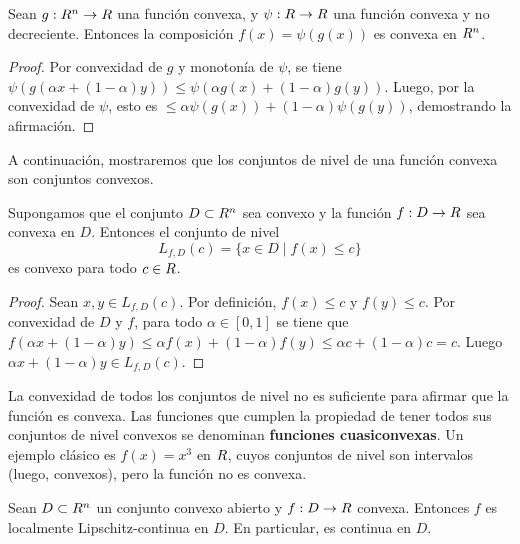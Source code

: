 \begin{proposition}\label{v1:prop:3.4.2}
 Sean $g : R^n \to R$ una función convexa, y $\psi : R \to R$ una función convexa y no decreciente. Entonces la composición $f(x) = \psi(g(x))$ es convexa en $R^n$.
\end{proposition}

\begin{proof}
 Por convexidad de $g$ y monotonía de $\psi$, se tiene $\psi(g(\alpha x + (1-\alpha)y)) \le \psi(\alpha g(x) + (1-\alpha)g(y))$. Luego, por la convexidad de $\psi$, esto es $\le \alpha \psi(g(x)) + (1-\alpha)\psi(g(y))$, demostrando la afirmación.
\end{proof}

A continuación, mostraremos que los conjuntos de nivel de una función convexa son conjuntos convexos.

\begin{theorem}\label{v1:thm:3.4.1}
 Supongamos que el conjunto $D \subset R^n$ sea convexo y la función $f : D \to R$ sea convexa en $D$. Entonces el conjunto de nivel
 \[
 L_{f,D}(c) = \{ x \in D \mid f(x) \le c \}
 \]
 es convexo para todo $c \in R$.
\end{theorem}

\begin{proof}
 Sean $x, y \in L_{f,D}(c)$. Por definición, $f(x) \le c$ y $f(y) \le c$. Por convexidad de $D$ y $f$, para todo $\alpha \in [0,1]$ se tiene que $f(\alpha x + (1-\alpha)y) \le \alpha f(x) + (1-\alpha)f(y) \le \alpha c + (1-\alpha)c = c$. Luego $\alpha x + (1-\alpha)y \in L_{f,D}(c)$.
\end{proof}

\begin{remark}
 La convexidad de todos los conjuntos de nivel no es suficiente para afirmar que la función es convexa. Las funciones que cumplen la propiedad de tener todos sus conjuntos de nivel convexos se denominan \textbf{funciones cuasiconvexas}. Un ejemplo clásico es $f(x) = x^3$ en $R$, cuyos conjuntos de nivel son intervalos (luego, convexos), pero la función no es convexa.
\end{remark}

\begin{theorem}\label{v1:thm:3.4.2}
 Sean $D \subset R^n$ un conjunto convexo abierto y $f : D \to R$ convexa. Entonces $f$ es localmente Lipschitz-continua en $D$. En particular, es continua en $D$.
\end{theorem}

